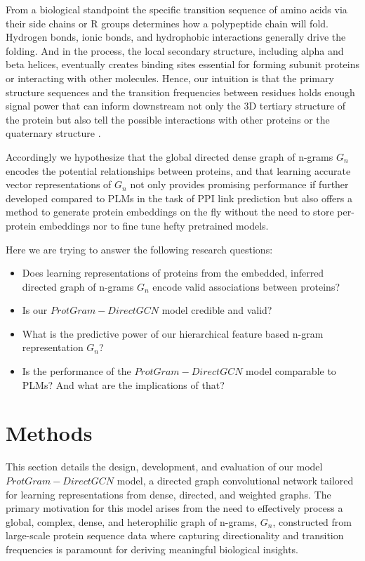 \documentclass[utf8]{article}
\begin{document}
	From a biological standpoint the specific transition sequence of amino acids via their side chains or R groups determines how a polypeptide chain will fold. Hydrogen bonds, ionic bonds, and hydrophobic interactions generally drive the folding. And in the process, the local secondary structure, including alpha and beta helices, eventually creates binding sites essential for forming subunit proteins or interacting with other molecules. Hence, our intuition is that the primary structure sequences and the transition frequencies between residues holds enough signal power that can inform downstream not only the 3D tertiary structure of the protein but also tell the possible interactions with other proteins or the quaternary structure \cite{dill_proteinfoldingproblem50_2012} \cite{perkins_transientproteinproteininteractions_2010} \cite{anfinsen_principlesthatgovern_1973}.
	
	Accordingly we hypothesize that the global directed dense graph of n-grams $G_{n}$ encodes the potential relationships between proteins, and that learning accurate vector representations of $G_{n}$ not only provides promising performance if further developed compared to PLMs in the task of PPI link prediction but also offers a method to generate protein embeddings on the fly without the need to store per-protein embeddings nor to fine tune hefty pretrained models.
	
	Here we are trying to answer the following research questions:
	\begin{itemize}
		\item Does learning representations of proteins from the embedded, inferred directed graph of n-grams $G_{n}$ encode valid associations between proteins? 
		\item Is our $ProtGram-DirectGCN$ model credible and valid?
		\item What is the predictive power of our hierarchical feature based n-gram representation $G_{n}$?
		\item Is the performance of the $ProtGram-DirectGCN$ model comparable to PLMs? And what are the implications of that?
	\end{itemize}
	
	\section{Methods}
	This section details the design, development, and evaluation of our model $ProtGram-DirectGCN$ model, a directed graph convolutional network tailored for learning representations from dense, directed, and weighted graphs. The primary motivation for this model arises from the need to effectively process a global, complex, dense, and heterophilic graph of n-grams, $G_{n}$, constructed from large-scale protein sequence data where capturing directionality and transition frequencies is paramount for deriving meaningful biological insights.
	
\end{document}
